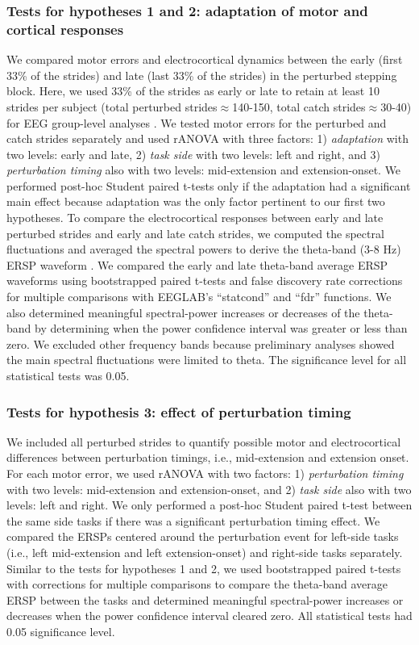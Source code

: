 \documentclass[../thesis_seyed.tex]{subfiles}
\begin{document}
\subsubsection{Tests for hypotheses 1 and 2: adaptation of motor and cortical responses}
We compared motor errors and electrocortical dynamics between the early (first 33\% of the strides) and late (last 33\% of the strides) in the perturbed stepping block. {Here, we used 33\% of the strides as early or late to retain at least 10 strides per subject (total perturbed strides$\approx$140-150, total catch strides$\approx$30-40) for EEG group-level analyses} \cite{Makeig1993-jx,Pfurtscheller1999-oi}. We tested motor errors for the perturbed and catch strides separately and used rANOVA with three factors: 1) \textit{adaptation} with two levels: early and late, 2) \textit{task side} with two levels: left and right, and 3) \textit{perturbation timing} also with two levels: mid-extension and extension-onset. We performed post-hoc Student paired t-tests only if the adaptation had a significant main effect because adaptation was the only factor pertinent to our first two hypotheses. To compare the electrocortical responses between early and late perturbed strides and early and late catch strides, we computed the spectral fluctuations and averaged the spectral powers to derive the theta-band (3-8 Hz) ERSP waveform \cite{Pfurtscheller1999-oi,Wagner2016-nx}. We compared the early and late theta-band average ERSP waveforms using bootstrapped paired t-tests {and false discovery rate corrections for multiple comparisons} with EEGLAB’s “statcond” and “fdr” functions. We also determined meaningful spectral-power increases or decreases of the theta-band by determining when the power confidence interval was greater or less than zero. We excluded other frequency bands because preliminary analyses showed the main spectral fluctuations were limited to theta. The significance level for all statistical tests was 0.05.

\subsubsection{Tests for hypothesis 3: effect of perturbation timing}
We included all perturbed strides to quantify possible motor and electrocortical differences between perturbation timings, i.e., mid-extension and extension onset. For each motor error, we used rANOVA with two factors: 1) \textit{perturbation timing} with two levels: mid-extension and extension-onset, and 2) \textit{task side} also with two levels: left and right. We only performed a post-hoc Student paired t-test between the same side tasks if there was a significant perturbation timing effect. We compared the ERSPs centered around the perturbation event for left-side tasks (i.e., left mid-extension and left extension-onset) and right-side tasks separately. Similar to the tests for hypotheses 1 and 2, we used bootstrapped paired t-tests {with corrections for multiple comparisons} to compare the theta-band average ERSP between the tasks and determined meaningful spectral-power increases or decreases when the power confidence interval cleared zero. All statistical tests had 0.05 significance level.
\end{document}
